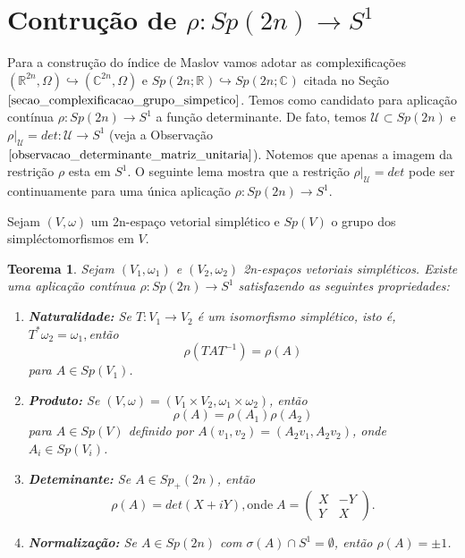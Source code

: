 \documentclass[12pt]{book}
\newtheorem{teorema}{Teorema}[section]
\newcommand{\circulo}{S^{1}}
\newcommand{\complexo}[1]{\mathbb{C}^{#1}}
\newcommand{\gruposimpletico}[1]{Sp(#1)}
\newcommand{\gruposimpleticocomplexo}[1]{Sp(#1; \complexo{})}
\newcommand{\gruposimpleticoreal}[1]{Sp(#1;\reta)}
\newcommand{\gruposimpleticopositivo}[1]{Sp_{+}(#1)}
\newcommand{\matrizSimpleticaOrtogonal}{\mathcal{U}}
\newcommand{\real}[1]{\mathbb{R}^{#1}}
\newcommand{\reta}{\real{}}
\begin{document}
	\section{Contrução de $\rho: \gruposimpletico{2n} \to \circulo$}
		Para a construção do índice de Maslov vamos adotar as complexificações $(\real{2n}, \Omega) \hookrightarrow (\complexo{2n}, \Omega)$ e $\gruposimpleticoreal{2n} \hookrightarrow \gruposimpleticocomplexo{2n}$ citada no Seção $\ref{secao_complexificacao_grupo_simpetico}$. Temos como candidato para aplicação contínua $\rho: \gruposimpletico{2n} \to \circulo$ a função determinante. De fato, temos $\matrizSimpleticaOrtogonal \subset \gruposimpletico{2n}$ e $\rho|_{\matrizSimpleticaOrtogonal}=det:\matrizSimpleticaOrtogonal \to \circulo$ (veja a Observação $\ref{observacao_determinante_matriz_unitaria}$). Notemos que apenas a imagem da restrição $\rho$ esta em $\circulo$. O seguinte lema mostra que a restrição $\rho|_{\matrizSimpleticaOrtogonal} = det$ pode ser continuamente para uma única aplicação  $\rho: \gruposimpletico{2n} \to \circulo$.
		
		Sejam $(V, \omega)$ um 2n-espaço vetorial simplético e $\gruposimpletico{V}$ o grupo dos simpléctomorfismos em $V$. 
		\begin{teorema}\label{teorema_aplicacao_rho}
			Sejam $(V_{1}, \omega_{1})$ e $(V_{2}, \omega_{2})$ 2n-espaços vetoriais simpléticos. Existe uma aplicação contínua $\rho:Sp(2n) \to S^{1}$ satisfazendo as seguintes propriedades:
			\begin{enumerate}
				\item \textbf{Naturalidade:}  Se $T:V_{1} \to V_{2}$ é um isomorfismo simplético, isto é, $T^{*}\omega_{2} = \omega_{1}, $então 
				$$
					\rho(TAT^{-1}) = \rho(A)
				$$
				para $A\in \gruposimpletico{V_{1}}$.
				
				\item \textbf{Produto:} Se $(V,\omega) = (V_{1}\times V_{2},\omega_{1}\times \omega_{2})$, então
				$$
					\rho(A) = \rho(A_{1})\rho(A_{2})
				$$
				para $A\in \gruposimpletico{V}$ definido por $A(v_{1}, v_{2})=(A_{2}v_{1}, A_{2}v_{2})$, onde $A_{i} \in \gruposimpletico{V_{i}}$.
				
				\item \textbf{Deteminante:} Se $A\in \gruposimpleticopositivo{2n}$, então 
				$$
					\rho(A) = det(X+iY), \text{onde} \;	
					A=\left(
					\begin{array}{cc}
					X & -Y					\\
					Y & X
					\end{array}
					\right).
				$$
				
				\item \textbf{Normalização:} Se $A \in \gruposimpletico{2n}$ com $\sigma(A)\cap \circulo = \emptyset$, então $\rho(A) = \pm 1$.
			\end{enumerate}
		\end{teorema}
		
\end{document}
